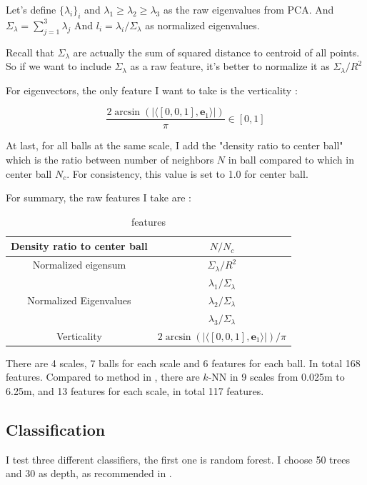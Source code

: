 \documentclass{article}
\begin{document}
Let's define $\{\lambda_i\}_{i}$ and $\lambda_1 \geq \lambda_2 \geq \lambda_3$ as the raw eigenvalues from PCA. And $\Sigma_\lambda = \sum_{j=1}^{3}\lambda_j$ And $l_i = \lambda_i / \Sigma_\lambda$ as normalized eigenvalues.

Recall that $\Sigma_\lambda$ are actually the sum of squared distance to centroid of all points. So if we want to include $\Sigma_\lambda$ as a raw feature, it's better to normalize it as ${\Sigma_\lambda}/{R^2}$

For eigenvectors, the only feature I want to take is the verticality : 

$$\frac{2\arcsin(|\langle [0,0,1], \mathbf{e}_1\rangle|)}{\pi} \in [0, 1]$$

At last, for all balls at the same scale, I add the "density ratio to center ball" which is the ratio between number of neighbors $N$ in ball compared to which in center ball $N_c$. For consistency, this value is set to 1.0 for center ball.

For summary, the raw features I take are : 
\begin{table}[h!]
	\centering
	\begin{tabular}{| c | c |} 
		\hline
		Density ratio to center ball & $N / N_c$\\
		\hline
		Normalized eigensum & ${\Sigma_\lambda}/{R^2}$ \\ 
		\hline
		\multirow{3}{*}{Normalized Eigenvalues}
		& $\lambda_1/\Sigma_\lambda$ \\
		& $\lambda_2/\Sigma_\lambda$ \\
		& $\lambda_3/\Sigma_\lambda$ \\
		\hline
		Verticality & $2\arcsin(|\langle [0,0,1], \mathbf{e}_1\rangle|) / \pi$\\
		\hline
	\end{tabular}
	\caption{features}
	\label{table:2}
\end{table}

There are 4 scales, 7 balls for each scale and 6 features for each ball. In total 168 features. Compared to method in \cite{hackel2016fast}, there are $k$-NN in 9 scales from 0.025m to 6.25m, and 13 features for each scale, in total 117 features. 


\subsection{Classification}
I test three different classifiers, the first one is random forest. I choose 50 trees and 30 as depth, as recommended in \cite{hackel2016fast}.
\end{document}

